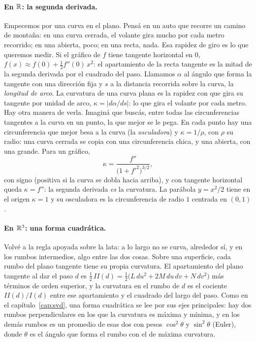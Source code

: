 \paragraph{En \(\mathbb{R}\): la segunda derivada.} Empecemos por una curva en el plano. Pensá en un
auto que recorre un camino de montaña: en una curva cerrada, el volante gira mucho por cada
metro recorrido; en una abierta, poco; en una recta, nada. Esa rapidez de giro es lo que
queremos medir. Si el gráfico de \(f\) tiene tangente horizontal
en \(0\), \(f(x)\approx f(0)+\tfrac12f''(0)\,x^2\): el apartamiento de la recta tangente es
la mitad de la segunda derivada por el cuadrado del paso. Llamamos \(\alpha\) al ángulo que
forma la tangente con una dirección fija y \(s\) a la distancia recorrida sobre la curva, la
\emph{longitud de arco}. La curvatura de una curva plana es
la rapidez con que gira su tangente por unidad de arco, \(\kappa=\lvert d\alpha/ds\rvert\): lo
que gira el volante por cada metro. Hay otra manera de verla. Imaginá que buscás, entre todas
las circunferencias tangentes a la curva en un punto, la que mejor se le pega. En cada punto
hay una circunferencia que mejor besa a la curva (la \emph{osculadora}) y
\(\kappa=1/\rho\), con \(\rho\) su radio: una curva cerrada se copia con una circunferencia
chica, y una abierta, con una grande. Para un gráfico,
\[
  \kappa=\frac{f''}{\bigl(1+f'^2\bigr)^{3/2}},
\]
con signo (positiva si la curva se dobla hacia arriba), y con tangente horizontal queda
\(\kappa=f''\): la segunda derivada \emph{es} la curvatura. La parábola \(y=x^2/2\) tiene en el
origen \(\kappa=1\) y su osculadora es la circunferencia de radio \(1\) centrada en \((0,1)\).

\paragraph{En \(\mathbb{R}^3\): una forma cuadrática.} Volvé a la regla apoyada sobre la lata: a lo
largo no se curva, alrededor sí, y en los rumbos intermedios, algo entre las dos cosas. Sobre una superficie, cada rumbo del plano
tangente tiene su propia curvatura. El apartamiento del plano tangente al dar el paso \(d\) es
\(\tfrac12\,II(d)=\tfrac12\bigl(L\,du^2+2M\,du\,dv+N\,dv^2\bigr)\) más términos de orden
superior, y la curvatura en el rumbo de \(d\) es el cociente \(II(d)/I(d)\) entre ese
apartamiento y el cuadrado del largo del paso. Como en el
capítulo~\ref{cap:svd}, una forma cuadrática se lee por sus ejes principales: hay dos rumbos
perpendiculares en los que la curvatura es máxima y mínima, y en los demás rumbos es un
promedio de esas dos con pesos \(\cos^2\theta\) y \(\sin^2\theta\) (Euler), donde \(\theta\) es
el ángulo que forma el rumbo con el de máxima curvatura.

